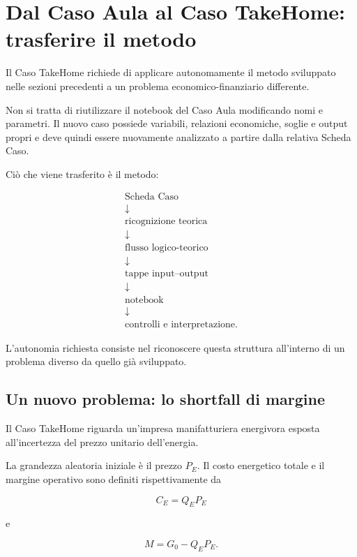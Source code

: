 \section{Dal Caso Aula al Caso TakeHome: trasferire il metodo}

Il Caso TakeHome richiede di applicare autonomamente il metodo sviluppato nelle
sezioni precedenti a un problema economico-finanziario differente.

Non si tratta di riutilizzare il notebook del Caso Aula modificando nomi e
parametri. Il nuovo caso possiede variabili, relazioni economiche, soglie e
output propri e deve quindi essere nuovamente analizzato a partire dalla
relativa Scheda Caso.

Ci\`{o} che viene trasferito \`{e} il metodo:

\[
\begin{array}{c}
\text{Scheda Caso}
\\[3pt]
\downarrow
\\[3pt]
\text{ricognizione teorica}
\\[3pt]
\downarrow
\\[3pt]
\text{flusso logico-teorico}
\\[3pt]
\downarrow
\\[3pt]
\text{tappe input--output}
\\[3pt]
\downarrow
\\[3pt]
\text{notebook}
\\[3pt]
\downarrow
\\[3pt]
\text{controlli e interpretazione}.
\end{array}
\]

L'autonomia richiesta consiste nel riconoscere questa struttura all'interno di
un problema diverso da quello gi\`{a} sviluppato.

\subsection{Un nuovo problema: lo shortfall di margine}

Il Caso TakeHome riguarda un'impresa manifatturiera energivora esposta
all'incertezza del prezzo unitario dell'energia.

La grandezza aleatoria iniziale \`{e} il prezzo $P_E$. Il costo energetico
totale e il margine operativo sono definiti rispettivamente da

\[
C_E=Q_E P_E
\]

\noindent e

\[
M=G_0-Q_E P_E.
\]

